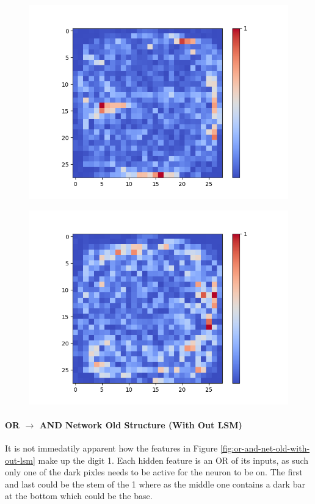 \begin{figure}[H]
\begin{minipage}[b]{0.19\textwidth}
		\includegraphics[width=\textwidth]{Sigmoid(Hidden-Layer)/Layer0-Neuron-24.png}
		\label{}
	\end{minipage}
	\begin{minipage}[b]{0.19\textwidth}
		\captionsetup{labelformat=empty}
		\includegraphics[width=\textwidth]{Sigmoid(Hidden-Layer)/Layer0-Neuron-28.png}
		\label{}
	\end{minipage}
	\caption{}
	\hfill
\end{figure}

\paragraph{OR $\rightarrow$ AND Network Old Structure (With Out LSM)}
It is not immedatily apparent how the features in Figure \ref{fig:or-and-net-old-with-out-lsm} make up the digit 1. Each hidden feature is an OR of its inputs, as such only one of the dark pixles needs to be active for the neuron to be on. The first and last could be the stem of the 1 where as the middle one contains a dark bar at the bottom which could be the base.

